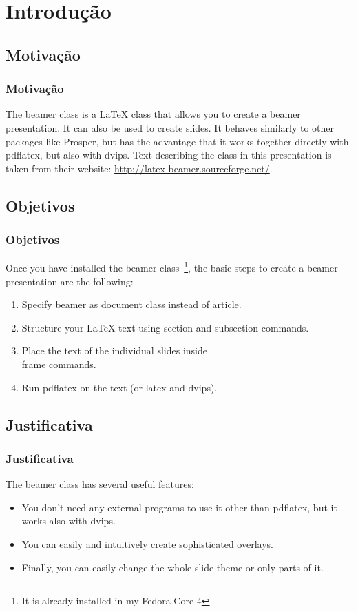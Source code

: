 \section{Introdução}
\subsection{Motivação}

\frame
{
	\frametitle{Motivação}
	
	The beamer class is a LaTeX class that allows you to create a beamer presentation. It can also be used to create slides. It behaves similarly to other packages like Prosper, but has the advantage that it works together directly with pdflatex, but also with dvips.
	Text describing the class in this presentation is taken from their website: \href{http://latex-beamer.sourceforge.net/}{http://latex-beamer.sourceforge.net/}.
}

\subsection{Objetivos}
\frame
{
	\frametitle{Objetivos}

	Once you have installed the beamer class~\footnote{It is already installed in my Fedora Core 4}, the basic steps to create a beamer presentation are the following:
	
	\begin{enumerate}
	\item Specify beamer as document class instead of article.
	\item Structure your LaTeX text using section and subsection commands.
	\item Place the text of the individual slides inside \\frame commands.
	\item Run pdflatex on the text (or latex and dvips).
	\end{enumerate}
}

\subsection{Justificativa}
\frame
{
	\frametitle{Justificativa}

	The beamer class has several useful features:
	
	\begin{itemize}
	\item You don't need any external programs to use it other than pdflatex, but it works also with dvips.
	\item You can easily and intuitively create sophisticated overlays.
	\item Finally, you can easily change the whole slide theme or only parts of it.
	\end{itemize}
}
